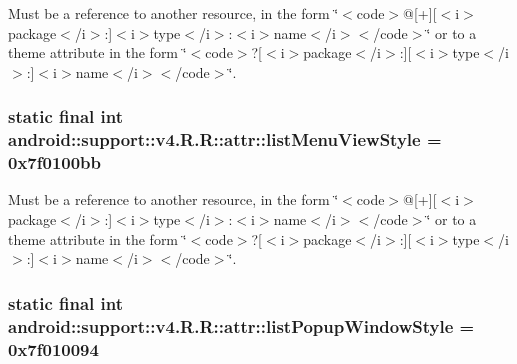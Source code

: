 Must be a reference to another resource, in the form \char`\"{}$<$code$>$@\mbox{[}+\mbox{]}\mbox{[}$<$i$>$package$<$/i$>$:\mbox{]}$<$i$>$type$<$/i$>$:$<$i$>$name$<$/i$>$$<$/code$>$\char`\"{} or to a theme attribute in the form \char`\"{}$<$code$>$?\mbox{[}$<$i$>$package$<$/i$>$:\mbox{]}\mbox{[}$<$i$>$type$<$/i$>$:\mbox{]}$<$i$>$name$<$/i$>$$<$/code$>$\char`\"{}. \hypertarget{classandroid_1_1support_1_1v4_1_1_r_1_1attr_b78351e81e4af1575c15d5904be051cd}{
\subsubsection[{listMenuViewStyle}]{\setlength{\rightskip}{0pt plus 5cm}static final int android::support::v4.R.R::attr::listMenuViewStyle = 0x7f0100bb}}
\label{classandroid_1_1support_1_1v4_1_1_r_1_1attr_b78351e81e4af1575c15d5904be051cd}


Must be a reference to another resource, in the form \char`\"{}$<$code$>$@\mbox{[}+\mbox{]}\mbox{[}$<$i$>$package$<$/i$>$:\mbox{]}$<$i$>$type$<$/i$>$:$<$i$>$name$<$/i$>$$<$/code$>$\char`\"{} or to a theme attribute in the form \char`\"{}$<$code$>$?\mbox{[}$<$i$>$package$<$/i$>$:\mbox{]}\mbox{[}$<$i$>$type$<$/i$>$:\mbox{]}$<$i$>$name$<$/i$>$$<$/code$>$\char`\"{}. \hypertarget{classandroid_1_1support_1_1v4_1_1_r_1_1attr_926afd0ad0e20a7fcb923f50fc7e0ddd}{
\subsubsection[{listPopupWindowStyle}]{\setlength{\rightskip}{0pt plus 5cm}static final int android::support::v4.R.R::attr::listPopupWindowStyle = 0x7f010094}}
\label{classandroid_1_1support_1_1v4_1_1_r_1_1attr_926afd0ad0e20a7fcb923f50fc7e0ddd}



